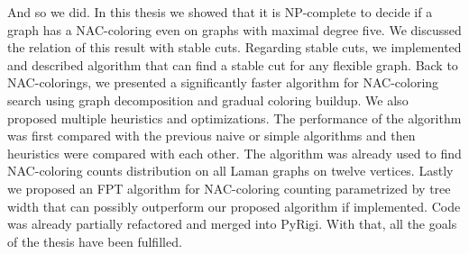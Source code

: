 And so we did.
In this thesis we showed that it is NP-complete
to decide if a graph has a NAC-coloring even on graphs with maximal degree five.
We discussed the relation of this result with stable cuts.
Regarding stable cuts, we implemented and described algorithm that can find
a stable cut for any flexible graph.
Back to NAC-colorings, we presented a significantly faster algorithm
for NAC-coloring search using graph decomposition and gradual coloring buildup.
We also proposed multiple heuristics and optimizations.
The performance of the algorithm was
first compared with the previous naive or simple
algorithms and then heuristics were compared with each other.
The algorithm was already used to find NAC-coloring counts distribution
on all Laman graphs on twelve vertices.
Lastly we proposed an FPT algorithm for NAC-coloring counting
parametrized by tree width that can
possibly outperform our proposed algorithm if implemented.
Code was already partially refactored and merged into PyRigi.
With that, all the goals of the thesis have been fulfilled.

